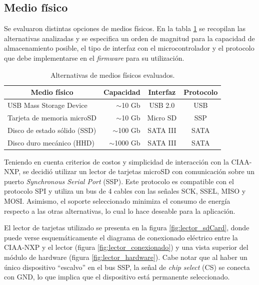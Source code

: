 \subsection{Medio físico}
\label{subsec:mediofisico}

Se evaluaron distintas opciones de medios físicos.  En la tabla \ref{tab:medios} se recopilan las alternativas analizadas y se especifica un orden de magnitud para la capacidad de almacenamiento posible, el tipo de interfaz con el microcontrolador y el protocolo que debe implementarse en el \textit{firmware} para su utilización.

\vspace{10px}

\begin{table}[ht]
\centering
\caption{Alternativas de medios físicos evaluados.}
\label{tab:medios}
\begin{tabular}{lrcc}
\toprule
\multicolumn{1}{c}{\textbf{Medio físico}} & \multicolumn{1}{c}{\textbf{Capacidad}} & \textbf{Interfaz} & \textbf{Protocolo} \\ \midrule
USB Mass Storage Device                   & $\sim$10 Gb                            & USB 2.0           & USB                \\
Tarjeta de memoria microSD                & $\sim$10 Gb                            & Micro SD          & SSP                \\
Disco de estado sólido (SSD)              & $\sim$100 Gb                           & SATA III          & SATA               \\
Disco duro mecánico (HHD)                 & $\sim$1000 Gb                          & SATA III          & SATA               \\ \bottomrule
\end{tabular}
\end{table}

\vspace{10px}

Teniendo en cuenta criterios de costos y simplicidad de interacción con la CIAA-NXP, se decidió utilizar un lector de tarjetas microSD con comunicación sobre un puerto \textit{Synchronous Serial Port} (SSP).  Este protocolo es compatible con el protocolo SPI y utiliza un bus de 4 cables con las señales SCK, SSEL, MISO y MOSI.  Asimismo, el soporte seleccionado minimiza el consumo de energía respecto a las otras alternativas, lo cual lo hace deseable para la aplicación.

El lector de tarjetas utilizado se presenta en la figura \ref{fig:lector_sdCard}, donde puede verse esquemáticamente el diagrama de conexionado eléctrico entre la CIAA-NXP y el lector (figura \ref{fig:lector_conexionado}) y una vista superior del módulo de hardware (figura \ref{fig:lector_hardware}). Cabe notar que al haber un único dispositivo ``escalvo'' en el bus SSP, la señal de \textit{chip select} (CS) se conecta con GND, lo que implica que el dispositivo está permanente seleccionado.

